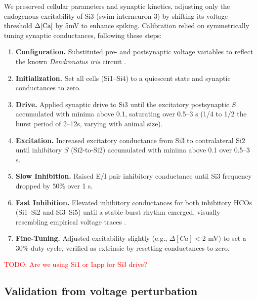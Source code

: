 \documentclass[nofootinbib,aip,amsmath,amssymb,reprint,twocolumn,10pt]{revtex4-2}
\begin{document}
We preserved cellular parameters and synaptic kinetics, adjusting only the endogenous excitability of Si3 (swim interneuron 3) by shifting its voltage threshold $\Delta [\rm Ca]$ by 5mV to enhance spiking.
Calibration relied on symmetrically tuning synaptic conductances, following these steps:\\
%
\begin{enumerate}
    \item \textbf{Configuration.} Substituted pre- and postsynaptic voltage variables to reflect the known \textit{Dendronotus iris} circuit \cite{SakuraiKatz2016}.
    \item \textbf{Initialization.} Set all cells (Si1--Si4) to a quiescent state and synaptic conductances to zero.
    \item \textbf{Drive.} Applied synaptic drive to Si3 until the excitatory postsynaptic $S$
    accumulated with minima above 0.1, saturating over 0.5--3 s (1/4 to 1/2 the burst period
     of 2--12s, varying with animal size).
    \item \textbf{Excitation.} Increased excitatory conductance from Si3 to contralateral Si2 until inhibitory $S$ (Si2-to-Si2) accumulated with minima above 0.1 over 0.5--3 s.
    \item \textbf{Slow Inhibition.} Raised E/I pair inhibitory conductance until Si3 frequency dropped by $50\%$ over 1 s.
    \item \textbf{Fast Inhibition.} Elevated inhibitory conductances for both inhibitory HCOs (Si1--Si2 and Si3--Si5) until a stable burst rhythm emerged, visually resembling empirical voltage traces \cite{SakuraiKatz2016}.
    \item \textbf{Fine-Tuning.} Adjusted excitability slightly (e.g., $\Delta [Ca] < 2$ mV) to set a 30\% duty cycle, verified as extrinsic by resetting conductances to zero.
\end{enumerate}

\textcolor{red}{TODO: Are we using Si1 or Iapp for Si3 drive?}

\subsection{Validation from voltage perturbation}
\end{document}
